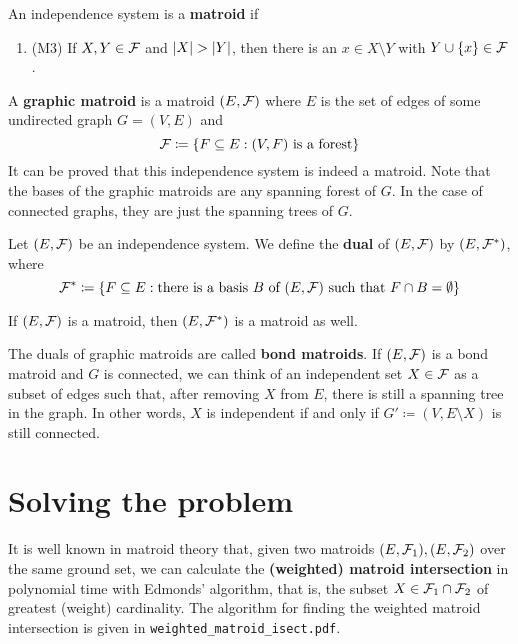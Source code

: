 \documentclass[english,12pt]{article}
\begin{document}
        \begin{definition}
            An independence system is a \textbf{matroid} if
            \begin{enumerate}
                \item (M3) If $X, Y \in \mathcal{F}$ and $\left|X\right| > \left|Y\right|$, then there is an $x \in X \setminus Y$ with $Y \cup \{x\} \in \mathcal{F}$.
            \end{enumerate}
        \end{definition}

        \begin{definition}
            A \textbf{graphic matroid} is a matroid $(E, \mathcal{F})$ where $E$ is the set of edges of some undirected graph $G = (V, E)$ and
            \[\mathcal{F} \coloneqq \{F \subseteq E : (V, F) \text{ is a forest}\}\]
            It can be proved that this independence system is indeed a matroid.
            Note that the bases of the graphic matroids are any spanning forest of $G$.
            In the case of connected graphs, they are just the spanning trees of $G$.
        \end{definition}

        \begin{definition}
            Let $(E, \mathcal{F})$ be an independence system. We define the \textbf{dual} of $(E, \mathcal{F})$ by $(E, \mathcal{F}^*)$, where
            \[\mathcal{F}^* \coloneqq \{F \subseteq E : \text{there is a basis } B \text { of } (E, \mathcal{F}) \text{ such that } F \cap B = \emptyset\}\]
        \end{definition}

        \begin{proposition}
            If $(E, \mathcal{F})$ is a matroid, then $(E, \mathcal{F}^*)$ is a matroid as well.
        \end{proposition}
        
        The duals of graphic matroids are called \textbf{bond matroids}.
        If $(E, \mathcal{F})$ is a bond matroid and $G$ is connected, we can think of an independent set $X \in \mathcal{F}$ as a subset of edges such that, after removing $X$ from $E$, there is still a spanning tree in the graph.
        In other words, $X$ is independent if and only if $G' \coloneqq (V, E \setminus X)$ is still connected.

    \section{Solving the problem}
        
        It is well known in matroid theory that, given two matroids $(E, \mathcal{F}_1), (E, \mathcal{F}_2)$ over the same ground set, we can calculate the \textbf{(weighted) matroid intersection} in polynomial time with Edmonds' algorithm, that is, the subset $X \in \mathcal{F}_1 \cap \mathcal{F}_2$ of greatest (weight) cardinality.
        The algorithm for finding the weighted matroid intersection is given in \verb*|weighted_matroid_isect.pdf|.
\end{document}
